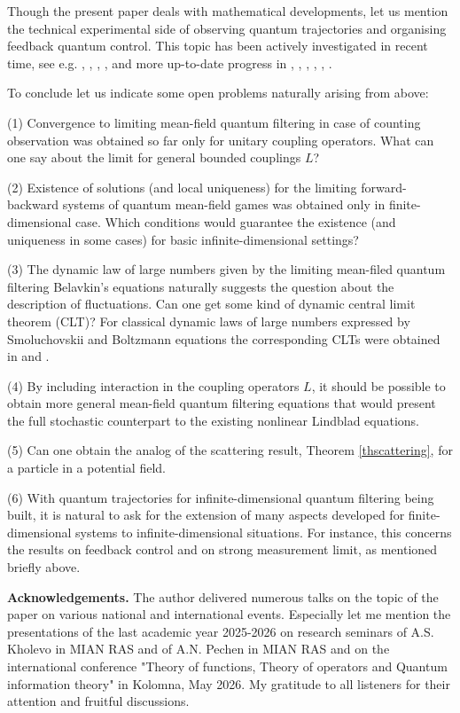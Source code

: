 \documentclass[12pt]{article}
\begin{document}
Though the present paper deals with mathematical developments, let us mention
the technical experimental side of observing quantum trajectories
and organising feedback quantum control. This topic has been actively investigated
in recent time, see e.g. \cite{Armen02Adaptive}, \cite{Bushev06Adaptive}, \cite{WiMilburnBook},
\cite{Breuer}, and more up-to-date progress in \cite{HarochePaperNature}, \cite{HarocheNobel},
\cite{WinelandNobel}, \cite{Murch}, \cite{Weber}, \cite{Zhang}.

To conclude let us indicate some open problems naturally arising from above:

(1) Convergence to limiting mean-field quantum filtering in case of counting observation
was obtained so far only for unitary coupling operators. What can one say about the limit
 for general bounded couplings $L$?

(2) Existence of solutions (and local uniqueness) for the limiting forward-backward systems
of quantum mean-field games was obtained only in finite-dimensional case. Which conditions would guarantee
the existence (and uniqueness in some cases) for basic infinite-dimensional settings?

(3) The dynamic law of large numbers given by the limiting mean-filed quantum filtering Belavkin's equations
naturally suggests the question about the description of fluctuations. Can one get some
kind of dynamic central limit theorem (CLT)? For classical dynamic laws of large numbers expressed by
Smoluchovskii and Boltzmann equations the corresponding CLTs were obtained in \cite{Kol10} and \cite{Kolbook10}.

(4) By including interaction in the coupling operators $L$, it should be possible to obtain more general
mean-field quantum filtering equations that would present the full stochastic counterpart
to the existing nonlinear Lindblad equations.

(5) Can one obtain the analog of the scattering result,
Theorem \ref{thscattering}, for a particle in a potential field.

(6) With quantum trajectories for infinite-dimensional quantum filtering being built, it is natural to
ask for the extension of many aspects developed for finite-dimensional systems to infinite-dimensional
situations. For instance, this concerns the results on feedback control and on strong measurement limit,
as mentioned briefly above.


{\bf Acknowledgements.} The author delivered  numerous talks on the topic of the paper on various national
and international events. Especially let me mention the presentations of the last academic year
2025-2026 on research seminars of A.S. Kholevo in MIAN RAS and of A.N. Pechen in MIAN RAS and on the international
conference "Theory of functions, Theory of operators and Quantum information theory" in Kolomna, May 2026.
My gratitude to all listeners for their attention and fruitful discussions.
\end{document}
